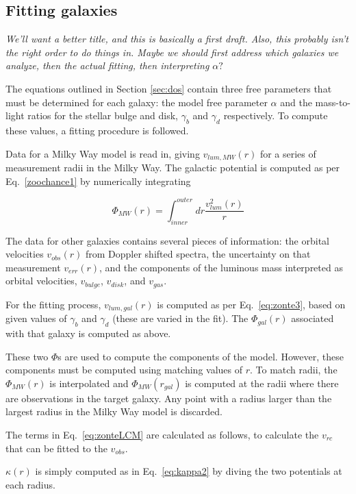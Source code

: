 \documentclass[reprint,%
 amsmath,amssymb,
 aps,
]{revtex4-1}
\begin{document}
\subsection{Fitting galaxies}
\emph{We'll want a better title, and this is basically a first draft.  Also, this probably isn't the right order to do things in. Maybe we should first address which galaxies we analyze, then the actual fitting, then interpreting $\alpha?$}

The equations outlined in Section \ref{sec:dos} contain three free parameters that must be determined for each galaxy: the model free parameter $\alpha$ and the mass-to-light ratios for the stellar bulge and disk, $\gamma_b$ and $\gamma_d$ respectively. To compute these values, a fitting procedure is followed.

Data for a Milky Way model is read in, giving $v_{lum,MW}(r)$ for a series of measurement radii in the Milky Way. The galactic potential is computed as per Eq.~\ref{zoochance1} by numerically integrating

\begin{equation}
\Phi_{MW}(r) = \int_{inner}^{outer} dr \frac{v_{lum}^2(r)}{r}
\end{equation}

The data for other galaxies contains several pieces of information: the   orbital velocities $v_{obs}(r)$ from Doppler shifted spectra, the uncertainty on that measurement $v_{err}(r)$, and the components of the luminous mass interpreted as orbital velocities,  $v_{bulge}$, $v_{disk}$, and $v_{gas}$. 

For the fitting process, $v_{lum,gal}(r)$ is computed as per Eq.~\ref{eq:zonte3}, based on given values of $\gamma_b$ and $\gamma_d$ (these are varied in the fit). The $\Phi_{gal}(r)$ associated with that galaxy is computed as above.

These two $\Phi$s are used to compute the components of the model. However, these components must be computed using matching values of $r$. To match radii, the $\Phi_{MW}(r)$ is interpolated and $\Phi_{MW}(r_{gal})$ is computed at the radii where there are observations in the target galaxy. Any point with a radius larger than the largest radius in the Milky Way model is discarded.

The terms in Eq.~\ref{eq:zonteLCM} are calculated as follows, to calculate the  $v_{rc}$ that can be fitted to the   $v_{obs}$. 

$\kappa(r)$ is simply computed as in Eq.~\ref{eq:kappa2} by diving the two potentials at each radius.
\end{document}
